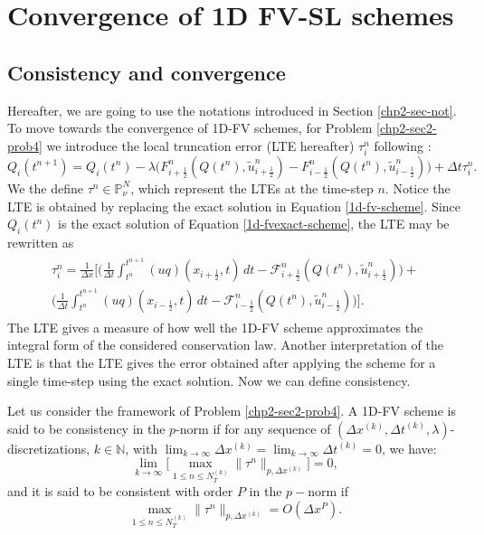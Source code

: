\section{Convergence of 1D FV-SL schemes}
\label{convergence-1dfvsl}
\subsection{Consistency and convergence}
\label{chp2-sub-CC}
Hereafter, we are going to use the notations introduced in Section \ref{chp2-sec-not}.
To move towards the convergence of 1D-FV schemes, for  Problem \ref{chp2-sec2-prob4} we introduce the local truncation error (LTE hereafter)
$\tau_i^n$ following \citet{leveque:2002}:
\begin{equation}
	\label{consistency-1d-eq1}
	Q_i(t^{n+1}) = Q_i(t^n) - \lambda
	\bigg({F}^n_{i+\frac{1}{2}}(Q(t^n),\tilde{u}^n_{i+\frac{1}{2}})-
	{F}^n_{i-\frac{1}{2}}(Q(t^n),\tilde{u}^n_{i-\frac{1}{2}}) \bigg) + \Delta t \tau_i^n.
\end{equation}
We the define $\tau^n \in \mathbb{P}^{N}_{\nu}$, which represent the LTEs at the time-step $n$.
Notice the LTE is obtained by replacing the exact solution in Equation \eqref{1d-fv-scheme}.
Since $Q_i(t^n)$ is the exact solution of Equation \eqref{1d-fvexact-scheme}, 
the LTE may be rewritten as
\begin{align}
	\begin{split}
		\label{consistency-1d-eq2}
		\tau_{i}^n = 
		\frac{1}{\Delta x} \bigg[  \bigg( \frac{1}{\Delta t}\int_{t^{n}}^{t^{n+1}}
		{(uq)}(x_{i+\frac{1}{2}}, t) \,dt - \mathcal{F}^n_{i+\frac{1}{2}}(Q(t^n),\tilde{u}^n_{i+\frac{1}{2}}) \bigg) +\\
		\bigg( \frac{1}{\Delta t}\int_{t^{n}}^{t^{n+1}}
		{(uq)}(x_{i-\frac{1}{2}}, t) \,dt - \mathcal{F}^n_{i-\frac{1}{2}}(Q(t^n),\tilde{u}^n_{i-\frac{1}{2}}) \bigg)
		\bigg].
	\end{split}
\end{align}
The LTE gives a measure of how well the 1D-FV scheme approximates the integral form
of the considered conservation law. 
Another interpretation of the LTE is that the LTE gives the error obtained after applying
the scheme for a single time-step using the exact solution.
Now we can define consistency.
\begin{definition}[Consistency]
	\label{chp2-def-cons}
	Let us consider the framework of Problem \ref{chp2-sec2-prob4}.
	A 1D-FV scheme is said to be consistency in the $p$-norm if for any sequence of $(\Delta x^{(k)}, \Delta t^{(k)},\lambda)$-discretizations, 
	$k \in \mathbb{N}$, with $\lim_{k\to \infty }{\Delta x^{(k)}} = \lim_{k\to \infty }{\Delta t^{(k)}} = 0$, we have:
	\begin{equation*}
		\lim_{k \to \infty}\bigg[ {\max_{1\leq n\leq N_T^{(k)}}}{\|\tau^n\|_{p,\Delta x^{(k)}}} \bigg] = 0,
	\end{equation*}
	and it is said to be consistent with order $P$ in the $p-$norm if %
	\begin{equation*}
		{\max_{1\leq n\leq N_T^{(k)}}}{\|\tau^n\|_{p,\Delta x^{(k)}}} = O(\Delta x^P).
	\end{equation*}
\end{definition}

